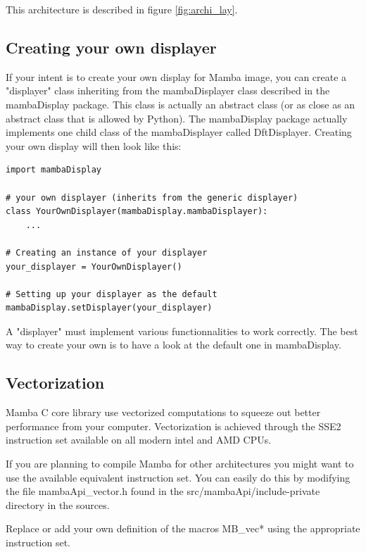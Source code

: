 \documentclass[a4paper,10pt,oneside]{article}
\begin{document}
This architecture is described in figure \ref{fig:archi_lay}.

\subsection{Creating your own displayer}
\label{cha:create_own_disp}

If your intent is to create your own display for Mamba image, you can create
a "displayer" class inheriting from the mambaDisplayer class described in the
mambaDisplay package. This class is actually an abstract class (or as close
as an abstract class that is allowed by Python). The mambaDisplay package
actually implements one child class of the mambaDisplayer called DftDisplayer.
Creating your own display will then look like this:

\lstset{language=Python}
\begin{lstlisting}
import mambaDisplay

# your own displayer (inherits from the generic displayer)
class YourOwnDisplayer(mambaDisplay.mambaDisplayer):
    ...
    
# Creating an instance of your displayer
your_displayer = YourOwnDisplayer()

# Setting up your displayer as the default
mambaDisplay.setDisplayer(your_displayer)
\end{lstlisting}

A "displayer" must implement various functionnalities to work correctly. The 
best way to create your own is to have a look at the default one in mambaDisplay.

\subsection{Vectorization}
\label{cha:vectorization}

Mamba C core library use vectorized computations to squeeze out better 
performance from your computer. Vectorization is achieved through the SSE2
instruction set available on all modern intel and AMD CPUs.

If you are planning to compile Mamba for other architectures you might want to
use the available equivalent instruction set. You can easily do this by modifying
the file mambaApi\_vector.h found in the src/mambaApi/include-private directory
in the sources.

Replace or add your own definition of the macros MB\_vec* using the appropriate
instruction set.
\end{document}
